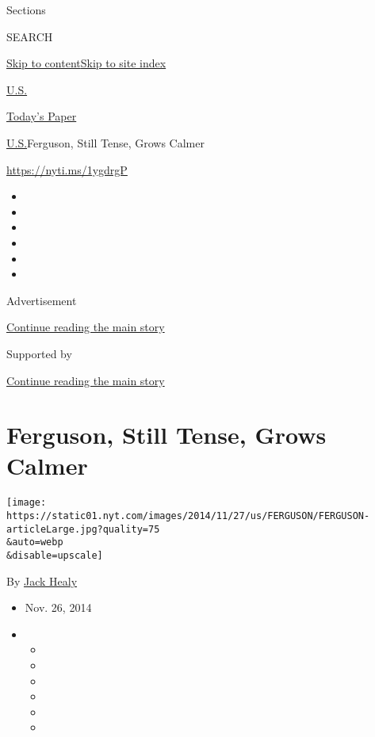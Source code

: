 Sections

SEARCH

\protect\hyperlink{site-content}{Skip to
content}\protect\hyperlink{site-index}{Skip to site index}

\href{https://www.nytimes.com/section/us}{U.S.}

\href{https://myaccount.nytimes.com/auth/login?response_type=cookie\&client_id=vi}{}

\href{https://www.nytimes.com/section/todayspaper}{Today's Paper}

\href{/section/us}{U.S.}\textbar{}Ferguson, Still Tense, Grows Calmer

\url{https://nyti.ms/1ygdrgP}

\begin{itemize}
\item
\item
\item
\item
\item
\item
\end{itemize}

Advertisement

\protect\hyperlink{after-top}{Continue reading the main story}

Supported by

\protect\hyperlink{after-sponsor}{Continue reading the main story}

\hypertarget{ferguson-still-tense-grows-calmer}{%
\section{Ferguson, Still Tense, Grows
Calmer}\label{ferguson-still-tense-grows-calmer}}

\texttt{[image: https://static01.nyt.com/images/2014/11/27/us/FERGUSON/FERGUSON-articleLarge.jpg?quality=75\\\&auto=webp\\\&disable=upscale]}

By \href{http://www.nytimes.com/by/jack-healy}{Jack Healy}

\begin{itemize}
\item
  Nov. 26, 2014
\item
  \begin{itemize}
  \item
  \item
  \item
  \item
  \item
  \item
  \end{itemize}
\end{itemize}

